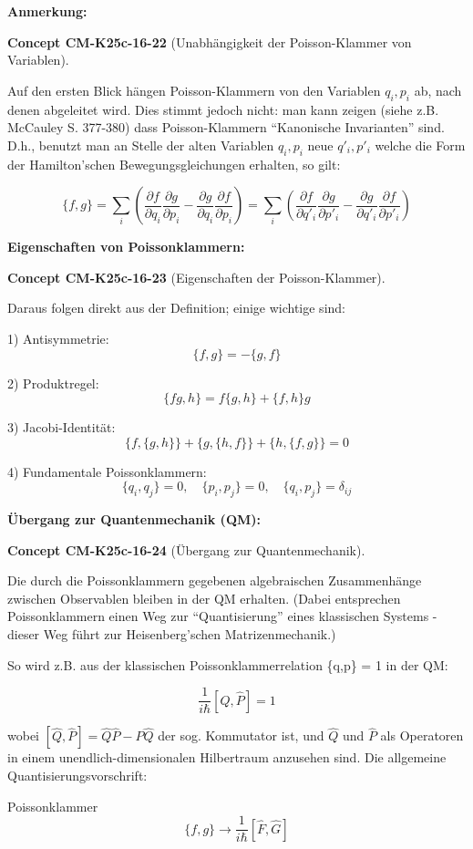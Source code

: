 \documentclass[10pt, letterpaper]{article}
\newcommand{\CustomHeading}[3]{%
  \par\medskip\noindent%
  \textbf{#1 #2} \textnormal{(#3)}.\enskip%
}
\newenvironment{CONC}[2]{\begin{unitbox}\CustomHeading{Concept}{#1}{#2}}{\end{unitbox}}
\begin{document}
\textbf{Anmerkung:}


\begin{CONC}{CM-K25c-16-22}{Unabhängigkeit der Poisson-Klammer von Variablen}
Auf den ersten Blick hängen Poisson-Klammern von den Variablen $q_i,p_i$ ab, nach denen abgeleitet wird. Dies stimmt jedoch nicht: man kann zeigen (siehe z.B. McCauley S. 377-380) dass Poisson-Klammern ``Kanonische Invarianten'' sind. D.h., benutzt man an Stelle der alten Variablen $q_i,p_i$ neue $q'_i,p'_i$ welche die Form der Hamilton'schen Bewegungsgleichungen erhalten, so gilt:

\[\{f,g\} = \sum_i \left(\frac{\partial f}{\partial q_i}\frac{\partial g}{\partial p_i} - \frac{\partial g}{\partial q_i}\frac{\partial f}{\partial p_i}\right) = \sum_i \left(\frac{\partial f}{\partial q'_i}\frac{\partial g}{\partial p'_i} - \frac{\partial g}{\partial q'_i}\frac{\partial f}{\partial p'_i}\right)\]
\end{CONC}



\textbf{Eigenschaften von Poissonklammern:}


\begin{CONC}{CM-K25c-16-23}{Eigenschaften der Poisson-Klammer}
Daraus folgen direkt aus der Definition; einige wichtige sind:

1) Antisymmetrie: 
\[\{f,g\} = -\{g,f\}\]

2) Produktregel:
\[\{fg,h\} = f\{g,h\} + \{f,h\}g\]

3) Jacobi-Identität:
\[\{f,\{g,h\}\} + \{g,\{h,f\}\} + \{h,\{f,g\}\} = 0\]

4) Fundamentale Poissonklammern:
\[\{q_i,q_j\} = 0, \quad \{p_i,p_j\} = 0, \quad \{q_i,p_j\} = \delta_{ij}\]
\end{CONC}

\textbf{Übergang zur Quantenmechanik (QM):}


\begin{CONC}{CM-K25c-16-24}{Übergang zur Quantenmechanik}
Die durch die Poissonklammern gegebenen algebraischen Zusammenhänge zwischen Observablen bleiben in der QM erhalten. (Dabei entsprechen Poissonklammern einen Weg zur ``Quantisierung'' eines klassischen Systems - dieser Weg führt zur Heisenberg'schen Matrizenmechanik.)

So wird z.B. aus der klassischen Poissonklammerrelation \{q,p\} = 1 in der QM:

\[\frac{1}{i\hbar}[\hat{Q},\hat{P}] = 1\]

wobei $[\hat{Q},\hat{P}]= \hat{Q}\hat{P}-\hat{P}\hat{Q}$ der sog. Kommutator ist, und $\hat{Q}$ und $\hat{P}$ als Operatoren in einem unendlich-dimensionalen Hilbertraum anzusehen sind. Die allgemeine Quantisierungsvorschrift:

Poissonklammer \[\{f,g\} \rightarrow \frac{1}{i\hbar}[\hat{F},\hat{G}]\]
\end{CONC}
\end{document}
